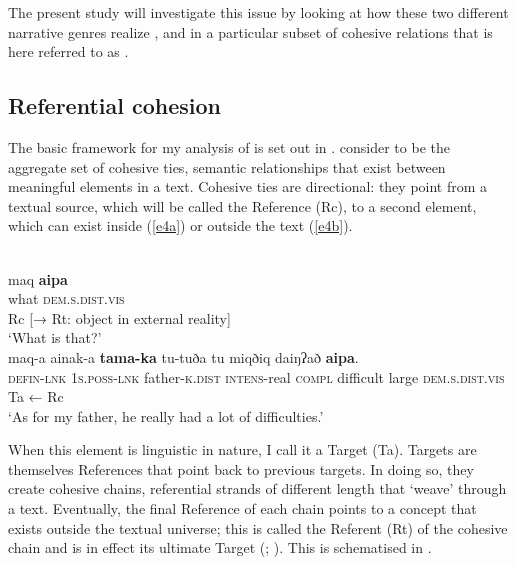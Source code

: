 \documentclass[output=paper
,modfonts
,nonflat]{langsci/langscibook}
\begin{document}
The present study will investigate this issue by looking at how these two different narrative genres realize , and in a particular subset of cohesive relations that is here referred to as .

\subsection{\label{s1.5}Referential cohesion}

The basic framework for my analysis of  is set out in \citet{DeBusser2017}. \citet{Halliday1976} consider  to be the aggregate set of cohesive ties, semantic relationships that exist between meaningful elements in a text. Cohesive ties are directional: they point from a textual source, which will be called the Reference (Rc), to a second element, which can exist inside (\ref{e4a}) or outside the text (\ref{e4b}). 

\begin{exe}
	\ex\label{e4}
	\begin{xlist}
		\label{e4a}\\
		\gll maq  \textbf{aipa}\\
		what  \textsc{dem.s.dist.vis}\\
		 Rc [→ Rt: object in external reality]\\
		\glt `What is that?’
		\label{e4b}\\
		\gll maq-a  ainak-a  \textbf{tama-ka}  tu-tuða  tu  miqðiq  daiŋʔað  \textbf{aipa}.\\
		\textsc{defin-lnk}  \textsc{1s}.\textsc{poss}-\textsc{lnk}  father-\textsc{k}.\textsc{dist}  \textsc{intens}-real  \textsc{compl}  difficult  large  \textsc{dem}.\textsc{s}.\textsc{dist}.\textsc{vis}\\
		 Ta ← Rc\\
		\glt `As for my father, he really had a lot of difficulties.’
	\end{xlist}
\end{exe}

\noindent
When this element is linguistic in nature, I call it a Target (Ta). Targets are themselves References that point back to previous targets. In doing so, they create cohesive chains, referential strands of different length that ‘weave’ through a text. Eventually, the final Reference of each chain points to a concept that exists outside the textual universe; this is called the Referent (Rt) of the cohesive chain and is in effect its ultimate Target (\citealt[329]{Halliday1976}; \citealt[107--108]{DeBusser2017}). This is schematised in .
\end{document}
